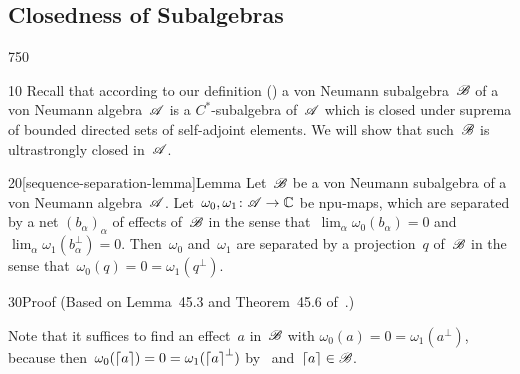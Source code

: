 \subsection{Closedness of Subalgebras}
\begin{parsec}{750}%
\begin{point}{10}%
Recall that according to our definition ()
a von Neumann subalgebra~$\mathscr{B}$ 
of a von Neumann algebra~$\mathscr{A}$
is a $C^*$-subalgebra of~$\mathscr{A}$
which is closed under suprema
of bounded directed sets of self-adjoint elements.
We will show that such~$\mathscr{B}$ is ultrastrongly closed in~$\mathscr{A}$.
\end{point}
\begin{point}{20}[sequence-separation-lemma]{Lemma}%
Let~$\mathscr{B}$ be a von Neumann subalgebra
of a von Neumann algebra~$\mathscr{A}$.
Let~$\omega_0,\omega_1\colon \mathscr{A}\to\mathbb{C}$
be npu-maps,
which are separated
by a net $(b_\alpha)_\alpha$
of effects of~$\mathscr{B}$ 
in the sense that~$\lim_\alpha \omega_0(b_\alpha)=0$
and $\lim_\alpha \omega_1(b_\alpha^\perp)=0$.
Then~$\omega_0$ and~$\omega_1$ are separated by a 
projection~$q$ of~$\mathscr{B}$ 
in the sense that~$\omega_0(q)= 0 = \omega_1(q^\perp)$.
\begin{point}{30}{Proof}%
(Based on Lemma~45.3 and Theorem~45.6 of~\cite{conway2000}.)

Note that it suffices to find an effect~$a$ in~$\mathscr{B}$
with $\omega_0(a) = 0 = \omega_1(a^\perp)$,
because then~$\omega_0(\left\lceil a\right\rceil) = 0 = \omega_1(\left\lceil a\right\rceil^\perp)$
by~
and~$\left\lceil a\right\rceil\in\mathscr{B}$.


\end{point}
\end{point}
\end{parsec}
